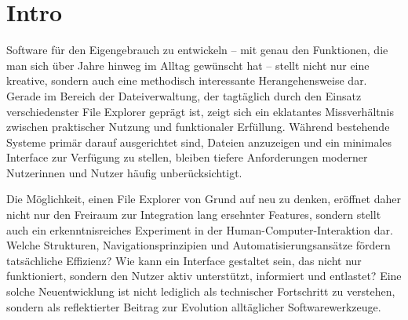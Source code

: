 \section{Intro} 
Software für den Eigengebrauch zu entwickeln – mit genau den Funktionen, die man sich über Jahre hinweg im Alltag
gewünscht hat – stellt nicht nur eine kreative, sondern auch eine methodisch interessante Herangehensweise dar. Gerade im Bereich
der Dateiverwaltung, der tagtäglich durch den Einsatz verschiedenster File Explorer geprägt ist, zeigt sich ein eklatantes
Missverhältnis zwischen praktischer Nutzung und funktionaler Erfüllung. Während bestehende Systeme primär darauf ausgerichtet
sind, Dateien anzuzeigen und ein minimales Interface zur Verfügung zu stellen, bleiben tiefere Anforderungen moderner Nutzerinnen
und Nutzer häufig unberücksichtigt.

Die Möglichkeit, einen File Explorer von Grund auf neu zu denken, eröffnet daher nicht nur den Freiraum zur Integration lang
ersehnter Features, sondern stellt auch ein erkenntnisreiches Experiment in der Human-Computer-Interaktion dar. Welche Strukturen,
Navigationsprinzipien und Automatisierungsansätze fördern tatsächliche Effizienz? Wie kann ein Interface gestaltet sein, das nicht
nur funktioniert, sondern den Nutzer aktiv unterstützt, informiert und entlastet? Eine solche Neuentwicklung ist nicht lediglich
als technischer Fortschritt zu verstehen, sondern als reflektierter Beitrag zur Evolution alltäglicher Softwarewerkzeuge.
